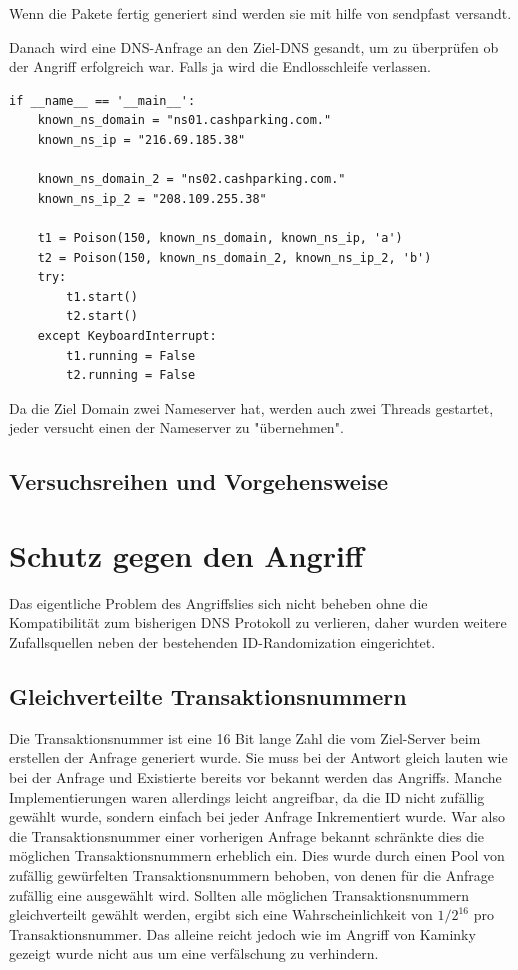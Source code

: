 \documentclass[10pt,a4paper]{article}
\begin{document}
Wenn die Pakete fertig generiert sind werden sie mit hilfe von sendpfast versandt.

Danach wird eine DNS-Anfrage an den Ziel-DNS gesandt, um zu überprüfen ob der Angriff erfolgreich war. Falls ja wird die Endlosschleife verlassen.

\begin{center}
\begin{lstlisting}
if __name__ == '__main__':
    known_ns_domain = "ns01.cashparking.com."
    known_ns_ip = "216.69.185.38"

    known_ns_domain_2 = "ns02.cashparking.com."
    known_ns_ip_2 = "208.109.255.38"

    t1 = Poison(150, known_ns_domain, known_ns_ip, 'a')
    t2 = Poison(150, known_ns_domain_2, known_ns_ip_2, 'b')
    try:
        t1.start()
        t2.start()
    except KeyboardInterrupt:
        t1.running = False
        t2.running = False
\end{lstlisting}
\end{center}
Da die Ziel Domain zwei Nameserver hat, werden auch zwei Threads gestartet, jeder versucht einen der Nameserver zu "übernehmen".

\subsection{Versuchsreihen und Vorgehensweise}

\section{Schutz gegen den Angriff}
Das eigentliche Problem des Angriffslies sich nicht beheben ohne die Kompatibilität zum bisherigen DNS Protokoll zu verlieren, daher wurden weitere Zufallsquellen neben der bestehenden ID-Randomization eingerichtet.

\subsection*{Gleichverteilte Transaktionsnummern}
Die Transaktionsnummer ist eine 16 Bit lange Zahl die vom Ziel-Server beim erstellen der Anfrage generiert wurde. Sie muss bei der Antwort gleich lauten wie bei der Anfrage und Existierte bereits vor bekannt werden das Angriffs. Manche Implementierungen waren allerdings leicht angreifbar, da die ID nicht zufällig gewählt wurde, sondern einfach bei jeder Anfrage Inkrementiert wurde. War also die Transaktionsnummer einer vorherigen Anfrage bekannt schränkte dies die möglichen Transaktionsnummern erheblich ein. Dies wurde durch einen Pool von zufällig gewürfelten Transaktionsnummern behoben, von denen für die Anfrage zufällig eine ausgewählt wird. Sollten alle möglichen Transaktionsnummern gleichverteilt gewählt werden, ergibt sich eine Wahrscheinlichkeit von $1/2^{16}$ pro Transaktionsnummer. Das alleine reicht jedoch wie im Angriff von Kaminky gezeigt wurde nicht aus um eine verfälschung zu verhindern. 
\end{document}
